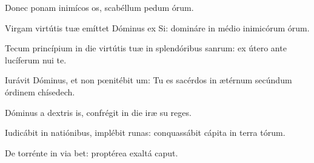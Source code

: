 \item {}

\item Donec ponam inimícos os,\psstar{} scabéllum pedum órum.

\item Virgam virtútis tuæ emíttet Dóminus ex Si:\psstar{} domináre in médio inimicórum órum.

\item Tecum princípium in die virtútis tuæ in splendóribus sanrum:\psstar{} ex útero ante lucíferum nui te.

\item Iurávit Dóminus, et non pœnitébit um:\psstar{} Tu es sacérdos in ætérnum secúndum órdinem chísedech.

\item Dóminus a dextris is,\psstar{} confrégit in die iræ su reges.

\item Iudicábit in natiónibus, implébit runas:\psstar{} conquassábit cápita in terra tórum.

\item De torrénte in via bet:\psstar{} proptérea exaltá caput.
